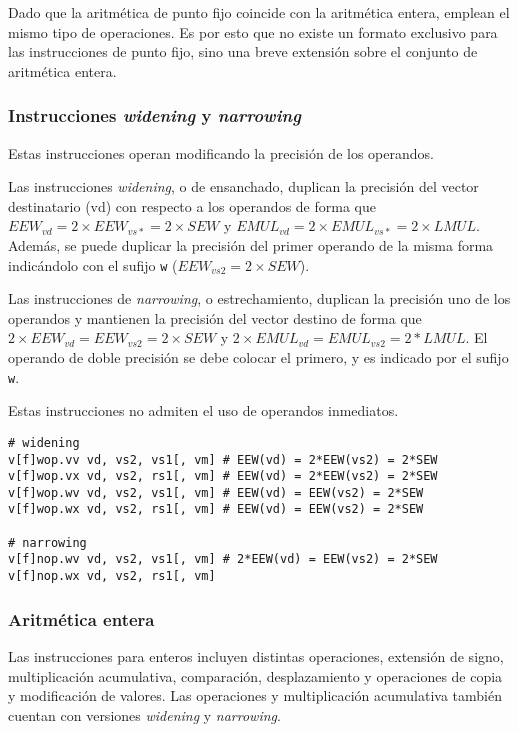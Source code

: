 Dado que la aritmética de punto fijo coincide con la aritmética entera, emplean
el mismo tipo de operaciones. Es por esto que no existe un formato exclusivo
para las instrucciones de punto fijo, sino una breve extensión sobre el
conjunto de aritmética entera.

\subsubsection{Instrucciones \textit{widening} y \textit{narrowing}}
Estas instrucciones operan modificando la precisión de los operandos.

Las instrucciones \textit{widening}, o de ensanchado, duplican la precisión del
vector destinatario (vd) con respecto a los operandos de forma
que $EEW_{vd} = 2\times EEW_{vs*} = 2\times SEW$ y $EMUL_{vd} = 2\times
EMUL_{vs*} = 2\times LMUL$. Además, se puede duplicar la precisión del primer
operando de la misma forma indicándolo con el sufijo \texttt{w} ($EEW_{vs2} = 2\times SEW$).

Las instrucciones de \textit{narrowing}, o estrechamiento, duplican la
precisión uno de los operandos y mantienen la precisión del vector destino
de forma que $2\times EEW_{vd} = EEW_{vs2} = 2\times SEW$ y $2\times
EMUL_{vd} = EMUL_{vs2} = 2*LMUL$. El operando de doble precisión se debe
colocar el primero, y es indicado por el sufijo \texttt{w}. 

Estas instrucciones no admiten el uso de operandos inmediatos.

\begin{lstlisting}
# widening
v[f]wop.vv vd, vs2, vs1[, vm] # EEW(vd) = 2*EEW(vs2) = 2*SEW
v[f]wop.vx vd, vs2, rs1[, vm] # EEW(vd) = 2*EEW(vs2) = 2*SEW
v[f]wop.wv vd, vs2, vs1[, vm] # EEW(vd) = EEW(vs2) = 2*SEW
v[f]wop.wx vd, vs2, rs1[, vm] # EEW(vd) = EEW(vs2) = 2*SEW
                       
# narrowing            
v[f]nop.wv vd, vs2, vs1[, vm] # 2*EEW(vd) = EEW(vs2) = 2*SEW
v[f]nop.wx vd, vs2, rs1[, vm]
\end{lstlisting}

\subsubsection{Aritmética entera}{\label{sec:int-operations}}

Las instrucciones para enteros incluyen distintas operaciones, extensión de
signo, multiplicación acumulativa, comparación, desplazamiento y operaciones de copia y
modificación de valores. Las operaciones y multiplicación acumulativa también
cuentan con versiones \textit{widening} y \textit{narrowing}.


